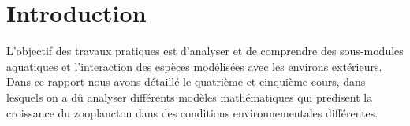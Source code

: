 \section{Introduction}

\par{
L'objectif des travaux pratiques est d'analyser et de comprendre des sous-modules
aquatiques et l'interaction des espèces modélisées avec les environs extérieurs.
Dans ce rapport nous avons détaillé le quatrième et cinquième cours, dans lesquels
on a dû analyser différents modèles mathématiques qui predisent la croissance du
zooplancton dans des conditions environnementales différentes.
}
